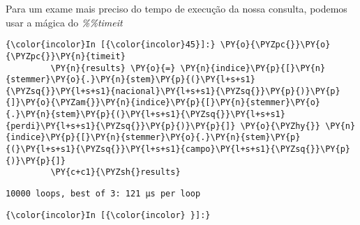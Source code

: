     Para um exame mais preciso do tempo de execução da nossa consulta,
podemos usar a mágica do \emph{\%\%timeit}

    \begin{Verbatim}[commandchars=\\\{\}]
{\color{incolor}In [{\color{incolor}45}]:} \PY{o}{\PYZpc{}}\PY{o}{\PYZpc{}}\PY{n}{timeit}
         \PY{n}{results} \PY{o}{=} \PY{n}{indice}\PY{p}{[}\PY{n}{stemmer}\PY{o}{.}\PY{n}{stem}\PY{p}{(}\PY{l+s+s1}{\PYZsq{}}\PY{l+s+s1}{nacional}\PY{l+s+s1}{\PYZsq{}}\PY{p}{)}\PY{p}{]}\PY{o}{\PYZam{}}\PY{n}{indice}\PY{p}{[}\PY{n}{stemmer}\PY{o}{.}\PY{n}{stem}\PY{p}{(}\PY{l+s+s1}{\PYZsq{}}\PY{l+s+s1}{perdi}\PY{l+s+s1}{\PYZsq{}}\PY{p}{)}\PY{p}{]} \PY{o}{\PYZhy{}} \PY{n}{indice}\PY{p}{[}\PY{n}{stemmer}\PY{o}{.}\PY{n}{stem}\PY{p}{(}\PY{l+s+s1}{\PYZsq{}}\PY{l+s+s1}{campo}\PY{l+s+s1}{\PYZsq{}}\PY{p}{)}\PY{p}{]}
         \PY{c+c1}{\PYZsh{}results}
\end{Verbatim}

    \begin{Verbatim}[commandchars=\\\{\}]
10000 loops, best of 3: 121 µs per loop

    \end{Verbatim}

    \begin{Verbatim}[commandchars=\\\{\}]
{\color{incolor}In [{\color{incolor} }]:} 
\end{Verbatim}


    
    
    
    